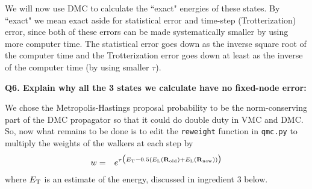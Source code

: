 \documentclass[11pt,aps,prb,amsmath,amssymb,superscriptaddress,notitlepage]{revtex4-1}
\def\beq{\begin{eqnarray}}
\def\eeq{\end{eqnarray}}
\def\Rvec{{\bf R}}
\def\EL{E_{\rm L}}
\begin{document}
We will now use DMC to calculate the ``exact" energies of these states.  By ``exact" we mean exact aside
for statistical error and time-step (Trotterization) error, since both of these errors can be made systematically
smaller by using more computer time.  The statistical error goes down as the inverse square root of the computer time
and the Trotterization error goes down at least as the inverse of the computer time (by using smaller $\tau$).

{\color{blue}
\textbf{Q6. Explain why all the 3 states we calculate have no fixed-node error:}\\

}

We chose the Metropolis-Hastings proposal probability to be the norm-conserving part of the DMC propagator
so that it could do double duty in VMC and DMC.  So, now what remains to be done is to edit the
\Verb"reweight" function in \Verb"qmc.py" to multiply the
weights of the walkers at each step by
\beq
w &=& e^{\tau\big(\ET-0.5(\EL(\Rvec_{\rm old}) + \EL(\Rvec_{\rm new}))\big)}
\label{rewt}
\eeq
where $E_{\rm T}$ is an estimate of the energy, discussed in ingredient 3 below.
\end{document}
